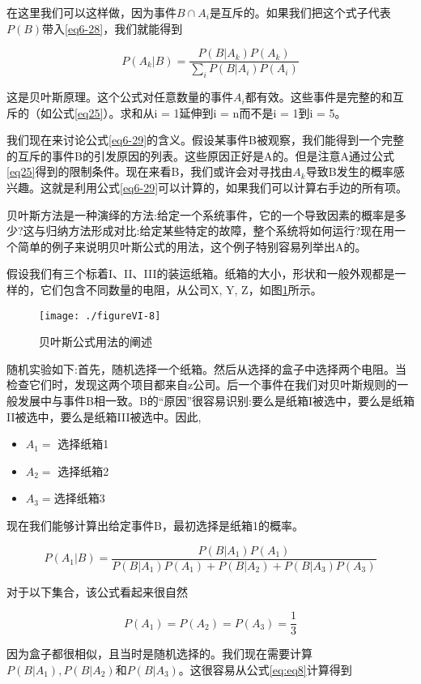 \documentclass[cn,11pt,chinese]{elegantbook}
\begin{document}
在这里我们可以这样做，因为事件$B\cap A_i$是互斥的。如果我们把这个式子代表$P(B)$带入\ref{eq6-28}，我们就能得到

\begin{equation}\label{eq6-29}
P(A_k|B)=\frac{P(B|A_k)P(A_k)}{\sum_i P(B|A_i)P(A_i)}
\end{equation}

这是贝叶斯原理。这个公式对任意数量的事件$A_i$都有效。这些事件是完整的和互斥的（如公式\ref{eq25}）。求和从i = 1延伸到i = n而不是i = 1到i = 5。

我们现在来讨论公式\ref{eq6-29}的含义。假设某事件B被观察，我们能得到一个完整的互斥的事件B的引发原因的列表。这些原因正好是A的。但是注意A通过公式\ref{eq25}得到的限制条件。现在来看B，我们或许会对寻找由$A_k$导致B发生的概率感兴趣。这就是利用公式\ref{eq6-29}可以计算的，如果我们可以计算右手边的所有项。

贝叶斯方法是一种演绎的方法:给定一个系统事件，它的一个导致因素的概率是多少?这与归纳方法形成对比:给定某些特定的故障，整个系统将如何运行?现在用一个简单的例子来说明贝叶斯公式的用法，这个例子特别容易列举出A的。

假设我们有三个标着I、II、III的装运纸箱。纸箱的大小，形状和一般外观都是一样的，它们包含不同数量的电阻，从公司X, Y, Z，如图\ref{fig6-8}所示。

\begin{figure}[h]
	\texttt{[image: ./figureVI-8]}
	\caption{贝叶斯公式用法的阐述}\label{fig6-8}
\end{figure}
随机实验如下:首先，随机选择一个纸箱。然后从选择的盒子中选择两个电阻。当检查它们时，发现这两个项目都来自z公司。后一个事件在我们对贝叶斯规则的一般发展中与事件B相一致。B的“原因”很容易识别:要么是纸箱I被选中，要么是纸箱II被选中，要么是纸箱III被选中。因此,

\begin{itemize}
	\item  $A_1 = $ 选择纸箱1
\item  $ A_2 = $ 选择纸箱2
\item  $ A_3 = $选择纸箱3
\end{itemize}

现在我们能够计算出给定事件B，最初选择是纸箱1的概率。

$$P(A_1|B)=\frac{P(B|A_1)P(A_1)}{P(B|A_1)P(A_1)+P(B|A_2)+P(B|A_3)P(A_3)}$$

对于以下集合，该公式看起来很自然

$$P(A_1)=P(A_2)=P(A_3)=\frac{1}{3}$$

因为盒子都很相似，且当时是随机选择的。我们现在需要计算$P(B|A_1),P(B|A_2)和P(B|A_3)$。这很容易从公式\ref{eq:eq8}计算得到
\end{document}
